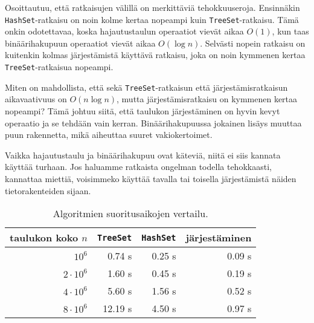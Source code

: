 Osoittautuu, että ratkaisujen välillä on merkittäviä tehokkuuseroja.
Ensinnäkin \texttt{HashSet}-ratkaisu on noin kolme kertaa
nopeampi kuin \texttt{TreeSet}-ratkaisu.
Tämä onkin odotettavaa, koska hajautustaulun
operaatiot vievät aikaa $O(1)$, kun taas binäärihakupuun
operaatiot vievät aikaa $O(\log n)$.
Selvästi nopein ratkaisu on kuitenkin kolmas järjestämistä
käyttävä ratkaisu, joka on noin kymmenen kertaa
\texttt{TreeSet}-ratkaisua nopeampi.

Miten on mahdollista, että sekä \texttt{TreeSet}-ratkaisun että
järjestämisrat\-kaisun aikavaativuus on $O(n \log n)$, mutta
järjestämisratkaisu on kymmenen kertaa nopeampi?
Tämä johtuu siitä, että taulukon järjestäminen on hyvin kevyt
operaatio ja se tehdään vain kerran.
Binäärihakupuussa jokainen lisäys muuttaa puun rakennetta,
mikä aiheuttaa suuret vakiokertoimet.

Vaikka hajautustaulu ja binäärihakupuu ovat käteviä,
niitä ei siis kannata käyttää turhaan.
Jos haluamme ratkaista ongelman todella tehokkaasti,
kannattaa miettiä, voisimmeko käyttää tavalla tai toisella
järjestämistä näiden tietorakenteiden sijaan.

\begin{table}
\center
\begin{tabular}{rrrr}
taulukon koko $n$ & \texttt{TreeSet} & \texttt{HashSet} & järjestäminen \\
\hline
$10^6$ & 0.74 s & 0.25 s & 0.09 s \\
$2 \cdot 10^6$ & 1.60 s & 0.45 s & 0.19 s \\
$4 \cdot 10^6$ & 5.60 s & 1.56 s & 0.52 s \\
$8 \cdot 10^6$ & 12.19 s & 4.50 s & 0.97 s \\
\end{tabular}
\caption{Algoritmien suoritusaikojen vertailu.}
\label{tab:eriver}
\end{table}
